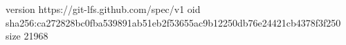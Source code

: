 version https://git-lfs.github.com/spec/v1
oid sha256:ca272828bc0fba539891ab51eb2f53655ac9b12250db76e24421cb4378f3f250
size 21968
